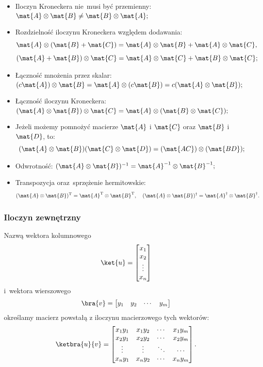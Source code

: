 \begin{itemize}
	\item Iloczyn Kroneckera nie~musi być przemienny: $\mat{A}\otimes \mat{B}\neq \mat{B} \otimes \mat{A};$
	\item Rozdzielność iloczynu Kroneckera względem dodawania:
	      $$
		      \mat{A} \otimes (\mat{B}+\mat{C}) = \mat{A} \otimes \mat{B} + \mat{A} \otimes \mat{C},
	      $$
	      $$
		      (\mat{A}+\mat{B})\otimes \mat{C} = \mat{A} \otimes \mat{C} + \mat{B} \otimes \mat{C};
	      $$
	\item Łączność mnożenia przez skalar:
	      $
		      (c\mat{A}) \otimes \mat{B} = \mat{A} \otimes (c\mat{B}) = c(\mat{A} \otimes \mat{B});
	      $
	\item Łączność iloczynu Kroneckera:
	      $
		      (\mat{A} \otimes \mat{B}) \otimes \mat{C} = \mat{A} \otimes (\mat{B} \otimes \mat{C});
	      $
	\item Jeżeli możemy pomnożyć macierze $\mat{A}$ i $\mat{C}$ oraz $\mat{B}$ i $\mat{D}$, to:
	      $$
		      (\mat{A} \otimes \mat{B})(\mat{C} \otimes \mat{D}) = (\mat{AC}) \otimes (\mat{BD});
	      $$
	\item Odwrotność:
	      $
		      (\mat{A} \otimes \mat{B})^{-1} = \mat{A}^{-1} \otimes \mat{B}^{-1};
	      $
	\item Transpozycja oraz~sprzężenie hermitowskie:
	      $$
		      (\mat{A}\otimes \mat{B})^\mathrm{T} = \mat{A}^\mathrm{T} \otimes \mat{B}^\mathrm{T}, \quad
		      (\mat{A}\otimes \mat{B})^\dagger = \mat{A}^\dagger \otimes \mat{B}^\dagger.
	      $$
\end{itemize}

\subsubsection{Iloczyn zewnętrzny}
Nazwą  wektora kolumnowego
$$
	\ket{u}=
	\begin{bmatrix}
		x_1    \\
		x_2    \\
		\vdots \\
		x_{n}  \\
	\end{bmatrix}
$$ i~wektora wierszowego
$$
	\bra{v}=
	\begin{bmatrix}
		y_1    &
		y_2    &
		\cdots &
		y_{m}
	\end{bmatrix}
$$
określamy macierz powstałą z iloczynu macierzowego tych wektorów:
$$
	\ketbra{u}{v}
	=\begin{bmatrix}
		x_1 y_1 & x_1 y_2 & \cdots & x_1 y_m \\
		x_2 y_1 & x_2 y_2 & \cdots & x_2 y_m \\
		\vdots  & \vdots  & \ddots & \cdots  \\
		x_n y_1 & x_n y_2 & \cdots & x_n y_m
	\end{bmatrix}.
$$

